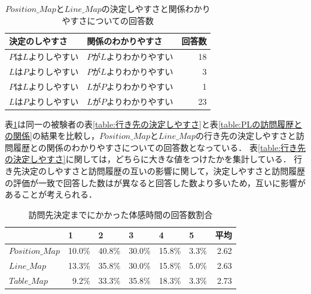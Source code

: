 \documentclass{deimj}
\begin{document}
\begin{table}[t]
    \caption{$Position\_Map$と$Line\_Map$の決定しやすさと関係わかりやすさについての回答数}
    \label{table:決定しやすさと関係わかりやすさについての回答数}
    \centering
    \begin{tabular}{l|l|r}
    \hline
    決定のしやすさ     & 関係のわかりやすさ      & \multicolumn{1}{l}{回答数} \\ \hline
    $P$は$L$よりしやすい & $P$が$L$よりわかりやすい & 18                       \\
    $L$は$P$よりしやすい & $P$が$L$よりわかりやすい & 3                        \\
    $P$は$L$よりしやすい & $L$が$P$よりわかりやすい & 1                        \\
    $L$は$P$よりしやすい & $L$が$P$よりわかりやすい & 23                       \\ \hline
    \end{tabular}
\end{table}
表\ref{table:決定しやすさと関係わかりやすさについての回答数}は同一の被験者の表\ref{table:行き先の決定しやすさ}と表\ref{table:PLの訪問履歴との関係}の結果を比較し，$Position\_Map$と$Line\_Map$の行き先の決定しやすさと訪問履歴との関係のわかりやすさについての回答数となっている．
表\ref{table:行き先の決定しやすさ}に関しては，どちらに大きな値をつけたかを集計している．
行き先決定のしやすさと訪問履歴の互いの影響に関して，決定しやすさと訪問履歴の評価が一致で回答した数はが異なると回答した数より多いため，互いに影響があることが考えられる．

\begin{table}[t]
    \caption{訪問先決定までにかかった体感時間の回答数割合}
    \label{table:訪問先決定までにかかった体感時間}
    \centering
    \begin{tabular}{l|rrrrr|r}
    \hline
                  & \multicolumn{1}{l}{1} & \multicolumn{1}{l}{2} & \multicolumn{1}{l}{3} & \multicolumn{1}{l}{4} & \multicolumn{1}{l|}{5} & \multicolumn{1}{l}{平均} \\ \hline
    $Position\_Map$ & 10.0\%               & 40.8\%               & 30.0\%               & 15.8\%               & 3.3\%                & 2.62                   \\
    $Line\_Map$     & 13.3\%               & 35.8\%               & 30.0\%               & 15.8\%               & 5.0\%                & 2.63                   \\
    $Table\_Map$    & 9.2\%                & 33.3\%               & 35.8\%               & 18.3\%               & 3.3\%                & 2.73                   \\ \hline
    \end{tabular}
\end{table}
\end{document}
